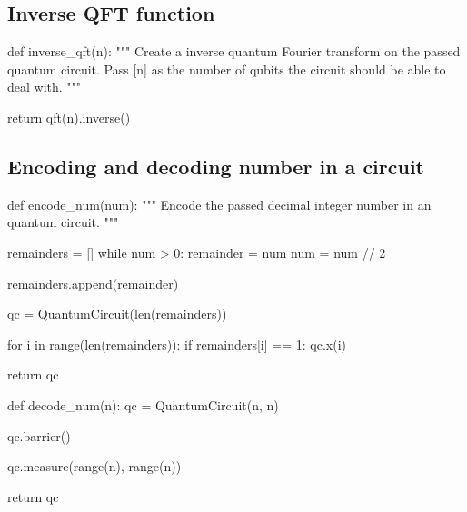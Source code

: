 \subsection{Inverse QFT function}
\label{subsec:inverse-qft-function}

\begin{python}
def inverse_qft(n):
    """
    Create a inverse quantum Fourier transform on the passed quantum circuit.
    Pass [n] as the number of qubits the circuit should be able to deal with.
    """

    return qft(n).inverse()
\end{python}

\subsection{Encoding and decoding number in a circuit}
\label{subsec:encoding-decoding-number-in-circuit}

\begin{python}
def encode_num(num):
    """
    Encode the passed decimal integer number in an quantum circuit.
    """

    remainders = []
    while num > 0:
        remainder = num %
        num = num // 2

        remainders.append(remainder)

    qc = QuantumCircuit(len(remainders))

    for i in range(len(remainders)):
        if remainders[i] == 1:
            qc.x(i)

    return qc


def decode_num(n):
    qc = QuantumCircuit(n, n)

    qc.barrier()

    qc.measure(range(n), range(n))

    return qc
\end{python}
